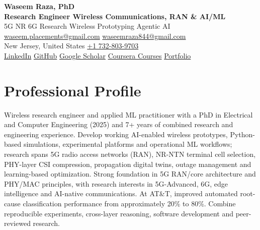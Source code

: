 \documentclass[9pt,letterpaper]{extarticle}
\begin{document}
\begin{center}
{\LARGE\bfseries Waseem Raza, PhD}{\normalsize\mdseries }\\[2pt]
{\large\bfseries Research Engineer \textbar{} Wireless Communications, RAN \& AI/ML}\\[1pt]
{\small 5G NR \textbar{} 6G Research \textbar{} Wireless Prototyping \textbar{} Agentic AI}\\[3pt]
{\footnotesize {}\enspace \href{mailto:waseem.placements@gmail.com}{waseem.placements@gmail.com} \textbar{} \href{mailto:waseemraza844@gmail.com}{waseemraza844@gmail.com}\\[1pt]New Jersey, United States \quad {}\enspace \href{tel:+17328039703}{+1 732-803-9703}\\[1pt]\href{https://www.linkedin.com/in/waseem-raza-phd-9a737858/}{LinkedIn} \textbar{} \href{https://github.com/WaseemRaza844}{GitHub} \textbar{} \href{https://scholar.google.com/citations?user=d58Drr0AAAAJ\&hl=en}{Google Scholar} \textbar{} \href{https://waseemraza844.github.io/portfolio/learning.html}{Coursera Courses} \textbar{} \href{https://waseemraza844.github.io/portfolio/}{Portfolio}}
\end{center}
\vspace{-5pt}
\section{Professional Profile}
Wireless research engineer and applied ML practitioner with a PhD in Electrical and Computer Engineering (2025) and 7+ years of combined research and engineering experience. Develop working AI-enabled wireless prototypes, Python-based simulations, experimental platforms and operational ML workflows; research spans 5G radio access networks (RAN), NR-NTN terminal cell selection, PHY-layer CSI compression, propagation digital twins, outage management and learning-based optimization. Strong foundation in 5G RAN/core architecture and PHY/MAC principles, with research interests in 5G-Advanced, 6G, edge intelligence and AI-native communications. At AT\&T, improved automated root-cause classification performance from approximately 20\% to 80\%. Combine reproducible experiments, cross-layer reasoning, software development and peer-reviewed research.
\end{document}
